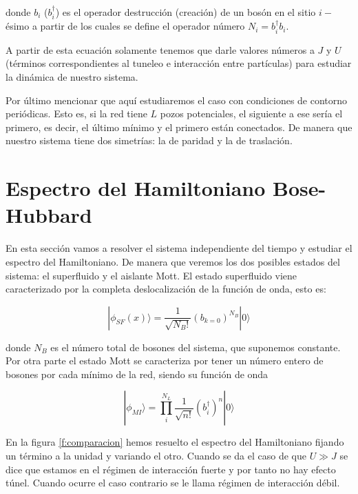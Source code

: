 \documentclass[11pt,a4paper]{article}
\begin{document}
donde $b_i$ ($b_i^{\dagger}$) es el operador destrucción (creación) de un bosón en el sitio $i-$\'esimo a partir de los cuales se define el operador número $N_i=b_i^{\dagger}b_i$.

A partir de esta ecuación solamente tenemos que darle valores números a $J$ y $U$ (términos correspondientes al tuneleo e interacción entre partículas) para estudiar la dinámica de nuestro sistema.


Por último mencionar que aquí estudiaremos el caso con condiciones de contorno periódicas. Esto es, si la red tiene $L$ pozos potenciales, el siguiente a ese sería el primero, es decir, el último mínimo y el primero están conectados. De manera que nuestro sistema tiene dos simetrías: la de paridad y la de traslación.


\section{Espectro del Hamiltoniano Bose-Hubbard}

En esta sección vamos a resolver el sistema independiente del tiempo y estudiar el espectro del Hamiltoniano. De manera que veremos los dos posibles estados del sistema: el superfluido y el aislante Mott. El estado superfluido viene caracterizado por la completa deslocalización de la función de onda, esto es:

\begin{equation}
  |\phi_{SF}(x)\rangle=\frac{1}{\sqrt{N_B!}}(b_{k=0})^{N_B}|0\rangle
\end{equation}

donde $N_B$ es el número total de bosones del sistema, que suponemos constante. Por otra parte el estado Mott se caracteriza por tener un número entero de bosones por cada mínimo de la red, siendo su función de onda

\begin{equation}
  |\phi_{MI}\rangle=\prod_i^{N_L}\frac{1}{\sqrt{n!}}(b_i^{\dagger})^n|0\rangle
\end{equation}


En la figura \ref{f:comparacion} hemos resuelto el espectro del Hamiltoniano fijando un término a la unidad y variando el otro. Cuando se da el caso de que $U\gg J$ se dice que estamos en el régimen de interacción fuerte y por tanto no hay efecto túnel. Cuando ocurre el caso contrario se le llama régimen de interacción débil.
\end{document}
